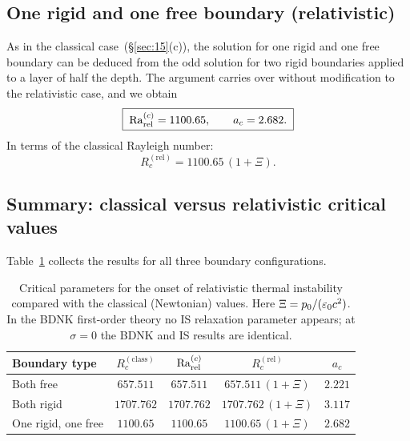 \subsection{One rigid and one free boundary (relativistic)}
\label{sec:rel-15c}

As in the classical case~(\S\ref{sec:15}(c)), the solution for one
rigid and one free boundary can be deduced from the odd solution for
two rigid boundaries applied to a layer of half the depth. The argument
carries over without modification to the relativistic case, and we
obtain
\begin{equation}
\label{eq:rel-15-Rcmixed}
\boxed{\;
\mathrm{Ra}_{\mathrm{rel}}^{(c)} = 1100.65, \qquad a_{c} = 2.682.
\;}
\end{equation}
In terms of the classical Rayleigh number:
\begin{equation}
\label{eq:rel-15-Rcmixed-classical}
R_{c}^{(\mathrm{rel})} = 1100.65\,(1+\Xi).
\end{equation}


\subsection{Summary: classical versus relativistic critical values}
\label{sec:rel-15d}

Table~\ref{tab:rel-15-summary} collects the results for all three
boundary configurations.

\begin{table}[htbp]
\centering
\caption{Critical parameters for the onset of relativistic thermal
  instability compared with the classical (Newtonian) values.
  Here $\Xi = p_{0}/(\varepsilon_{0}c^{2})$.  In the BDNK first-order
  theory no IS relaxation parameter appears; at $\sigma=0$ the
  BDNK and IS results are identical.}
\label{tab:rel-15-summary}
\medskip
\begin{tabular}{@{}l c c c c@{}}
\toprule
Boundary type
  & $R_{c}^{(\mathrm{class})}$
  & $\mathrm{Ra}_{\mathrm{rel}}^{(c)}$
  & $R_{c}^{(\mathrm{rel})}$
  & $a_{c}$ \\
\midrule
Both free
  & $657.511$
  & $657.511$
  & $657.511\,(1{+}\Xi)$
  & $2.221$ \\[4pt]
Both rigid
  & $1707.762$
  & $1707.762$
  & $1707.762\,(1{+}\Xi)$
  & $3.117$ \\[4pt]
One rigid, one free
  & $1100.65$
  & $1100.65$
  & $1100.65\,(1{+}\Xi)$
  & $2.682$ \\
\bottomrule
\end{tabular}
\end{table}

